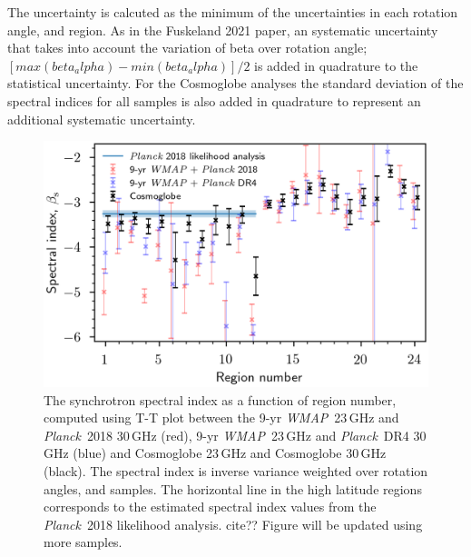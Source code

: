 \documentclass[twocolumn]{../../common/aa}
\def\WMAP{\emph{WMAP}}
\def\Planck{\emph{Planck}}
\newcommand{\red}[0]{\color{red}}
\begin{document}
The uncertainty is calcuted as the minimum of the uncertainties in each rotation angle, and region. As in the Fuskeland 2021 paper, an systematic uncertainty that takes into account the variation of beta over rotation angle; $[ max(beta_alpha) - min(beta_alpha) ] /2$ is added in quadrature to the statistical uncertainty.
For the Cosmoglobe analyses the standard deviation of the spectral indices for all samples is also added in quadrature to represent an additional systematic uncertainty.

\begin{figure}
        \centering
        \includegraphics[width=\linewidth]{figures/cos30_region_beta_cosmoglobe_vs_wmap.png}
        \caption{The synchrotron spectral index as a function of region number, computed using T-T plot between the 9-yr \WMAP\ 23\,GHz and \Planck\ 2018 30\,GHz (red), 9-yr \WMAP\ 23\,GHz and \Planck\ DR4 30\,GHz (blue) and Cosmoglobe 23\,GHz and Cosmoglobe 30\,GHz (black). The spectral index is inverse variance weighted over rotation angles, and samples. The horizontal line in the high latitude regions corresponds to the estimated spectral index values from the \Planck\ 2018 likelihood analysis. cite?? {\red Figure will be updated using more samples.}}
        \label{fig:cos30_beta_region}
\end{figure}
\end{document}
